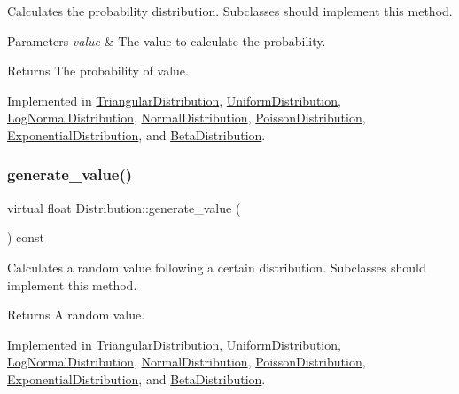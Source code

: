 Calculates the probability distribution. Subclasses should implement this method. 
\begin{DoxyParams}{Parameters}
{\em value} & The value to calculate the probability. \\
\hline
\end{DoxyParams}
\begin{DoxyReturn}{Returns}
The probability of value. 
\end{DoxyReturn}


Implemented in \hyperlink{classTriangularDistribution_a9a87e1d66d544ce0460dd457a6740dce}{Triangular\+Distribution}, \hyperlink{classUniformDistribution_a3e96960abeab2f77b22c3a2b9c80695b}{Uniform\+Distribution}, \hyperlink{classLogNormalDistribution_ab60a8974eaed392159b794994ed20999}{Log\+Normal\+Distribution}, \hyperlink{classNormalDistribution_a9e53ead03edb6441713d84eaa73976dd}{Normal\+Distribution}, \hyperlink{classPoissonDistribution_a48783969aa40f3d9549a9db51ca1c97a}{Poisson\+Distribution}, \hyperlink{classExponentialDistribution_a3299605c567141253eb32891f19ccef8}{Exponential\+Distribution}, and \hyperlink{classBetaDistribution_a83fdd40854dbcf9ab2654e82ceb011d0}{Beta\+Distribution}.

\mbox{\label{classDistribution_aa1ea89994ac123f003b8b8f5fe6fad40}} 
\subsubsection{\texorpdfstring{generate\+\_\+value()}{generate\_value()}}
{\footnotesize\ttfamily virtual float Distribution\+::generate\+\_\+value (\begin{DoxyParamCaption}{ }\end{DoxyParamCaption}) const\hspace{0.3cm}{\ttfamily [pure virtual]}}

Calculates a random value following a certain distribution. Subclasses should implement this method. \begin{DoxyReturn}{Returns}
A random value. 
\end{DoxyReturn}


Implemented in \hyperlink{classTriangularDistribution_a76d6a4477676d8f4d85513b887b4f2b3}{Triangular\+Distribution}, \hyperlink{classUniformDistribution_ab2bfddd4540b6f88d1d366c9d1bbb5e6}{Uniform\+Distribution}, \hyperlink{classLogNormalDistribution_a02ed860dc4f556df25e9274cd106937c}{Log\+Normal\+Distribution}, \hyperlink{classNormalDistribution_a121b2abfc13fc376512aa4f7e2fb1bb4}{Normal\+Distribution}, \hyperlink{classPoissonDistribution_ab9c01eabf7c125677da2dc56d23e4212}{Poisson\+Distribution}, \hyperlink{classExponentialDistribution_aab3b68ba1f724307b74108ac96f92357}{Exponential\+Distribution}, and \hyperlink{classBetaDistribution_ab99568888730dc83177503ae52de7c4b}{Beta\+Distribution}.

